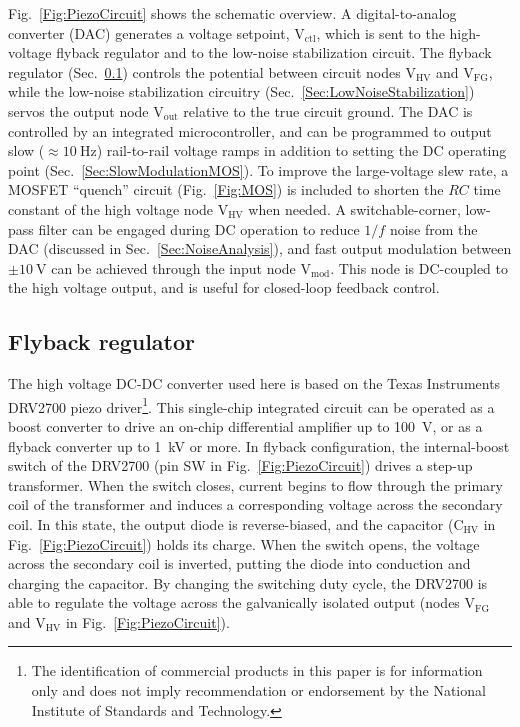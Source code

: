 \documentclass[aip,rsi,reprint]{revtex4-1} %
\begin{document}
Fig.~\ref{Fig:PiezoCircuit} shows the schematic overview. 
A digital-to-analog converter (DAC) generates a voltage setpoint, $\text{V}_\text{ctl}$, which is sent to the high-voltage flyback regulator and to the low-noise stabilization circuit.
The flyback regulator (Sec.~\ref{Sec:DRV2700}) controls the potential between circuit nodes $\text{V}_\text{HV}$ and $\text{V}_\text{FG}$, while the low-noise stabilization circuitry (Sec.~\ref{Sec:LowNoiseStabilization}) servos the output node $\text{V}_\text{out}$ relative to the true circuit ground.
The DAC is controlled by an integrated microcontroller, and can be programmed to output slow ($\approx\SI{10}{\hertz}$) rail-to-rail voltage ramps in addition to setting the DC operating point (Sec.~\ref{Sec:SlowModulationMOS}).
To improve the large-voltage slew rate, a MOSFET ``quench'' circuit (Fig.~\ref{Fig:MOS}) is included to shorten the $RC$ time constant of the high voltage node $\text{V}_\text{HV}$ when needed.
A switchable-corner, low-pass filter can be engaged during DC operation to reduce $1/f$ noise from the DAC (discussed in Sec.~\ref{Sec:NoiseAnalysis}), and
fast output modulation between $\pm\SI{10}{\volt}$ can be achieved through the input node $\text{V}_\text{mod}$.
This node is DC-coupled to the high voltage output, and is useful for closed-loop feedback control.




\subsection{Flyback regulator}
\label{Sec:DRV2700}

The high voltage DC-DC converter used here is based on the Texas Instruments DRV2700 piezo driver\footnote{The identification of commercial products in this paper is for information only and does not imply recommendation or endorsement by the National Institute of Standards and Technology.}.
This single-chip integrated circuit can be operated as a boost converter to drive an on-chip differential amplifier up to \SI{100}{\volt}, or as a flyback converter up to \SI{1}{\kilo\volt} or more.
In flyback configuration, the internal-boost switch of the DRV2700 (pin SW in Fig.~\ref{Fig:PiezoCircuit}) drives a step-up transformer.
When the switch closes, current begins to flow through the primary coil of the transformer and induces a corresponding voltage across the secondary coil.
In this state, the output diode is reverse-biased, and the capacitor ($\text{C}_{\text{HV}}$ in Fig.~\ref{Fig:PiezoCircuit}) holds its charge.
When the switch opens, the voltage across the secondary coil is inverted, putting the diode into conduction and charging the capacitor.
By changing the switching duty cycle, the DRV2700 is able to regulate the voltage across the galvanically isolated output (nodes $\text{V}_\text{FG}$ and $\text{V}_\text{HV}$ in Fig.~\ref{Fig:PiezoCircuit}).
\end{document}
